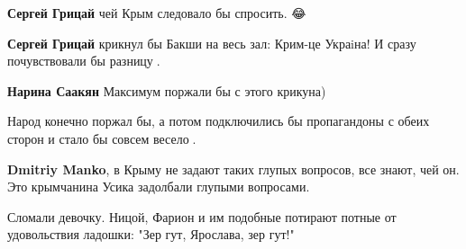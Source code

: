 \begin{itemize}
\begin{itemize}
\textbf{Сергей Грицай} чей Крым следовало бы спросить. 😂

 
\textbf{Сергей Грицай} крикнул бы Бакши на весь зал: Крим-це Украiна! И сразу почувствовали бы разницу🤣.

 
\textbf{Нарина Саакян} Максимум поржали бы с этого крикуна)

 
Народ конечно поржал бы, а потом подключились бы пропагандоны с обеих сторон и стало бы совсем весело🤣.

 
\textbf{Dmitriy Manko}, в Крыму не задают таких глупых вопросов, все знают, чей он. Это крымчанина Усика задолбали глупыми вопросами.
\end{itemize}

 
Сломали девочку. Ницой, Фарион и им подобные потирают потные от удовольствия
ладошки: "Зер гут, Ярослава, зер гут!"

\begin{itemize}
 

\end{itemize}
\end{itemize}

